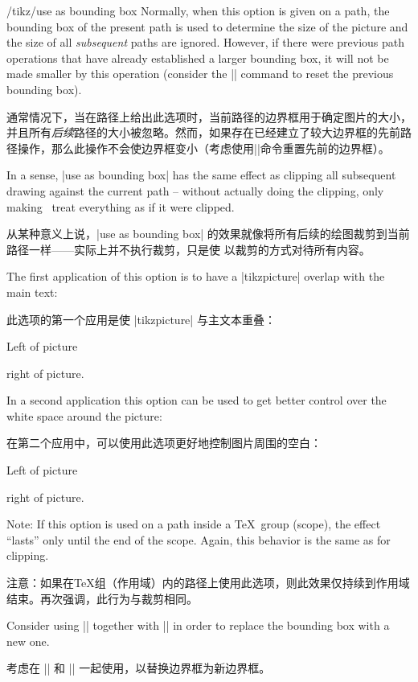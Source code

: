 \begin{key}{/tikz/use as bounding box}
    Normally, when this option is given on a path, the bounding box of the
    present path is used to determine the size of the picture and the size of
    all \emph{subsequent} paths are ignored. However, if there were previous
    path operations that have already established a larger bounding box, it
    will not be made smaller by this operation (consider the
    |\pgfresetboundingbox| command to reset the previous bounding box).

    通常情况下，当在路径上给出此选项时，当前路径的边界框用于确定图片的大小，并且所有\emph{后续}路径的大小被忽略。然而，如果存在已经建立了较大边界框的先前路径操作，那么此操作不会使边界框变小（考虑使用|\pgfresetboundingbox|命令重置先前的边界框）。


    In a sense, |use as bounding box| has the same effect as clipping all
    subsequent drawing against the current path -- without actually doing the
    clipping, only making \pgfname\ treat everything as if it were clipped.

    从某种意义上说，|use as bounding box| 的效果就像将所有后续的绘图裁剪到当前路径一样——实际上并不执行裁剪，只是使 \pgfname 以裁剪的方式对待所有内容。


    The first application of this option is to have a |{tikzpicture}| overlap
    with the main text:
    
    此选项的第一个应用是使 |{tikzpicture}| 与主文本重叠：

\begin{codeexample}[]
Left of pictureright of picture.
\end{codeexample}

    In a second application this option can be used to get better control over
    the white space around the picture:

    在第二个应用中，可以使用此选项更好地控制图片周围的空白：

\begin{codeexample}[]
Left of picture
right of picture.
\end{codeexample}

    Note: If this option is used on a path inside a \TeX\ group (scope), the
    effect ``lasts'' only until the end of the scope. Again, this behavior is
    the same as for clipping.

    注意：如果在\TeX 组（作用域）内的路径上使用此选项，则此效果仅持续到作用域结束。再次强调，此行为与裁剪相同。


    Consider using |\useasboundingbox| together with |\pgfresetboundingbox| in
    order to replace the bounding box with a new one.

    考虑在 |\useasboundingbox| 和 |\pgfresetboundingbox| 一起使用，以替换边界框为新边界框。
\end{key}

